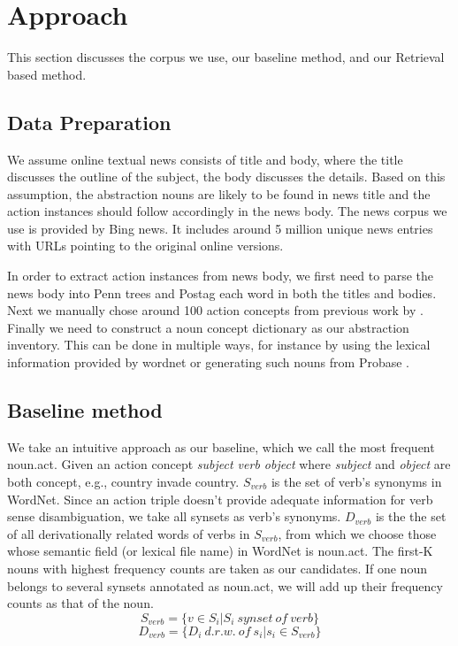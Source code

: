\section{Approach}
This section discusses the corpus we use, our baseline method, 
and our Retrieval based method.

\subsection{Data Preparation}

We assume online textual news consists of title and body, where
the title discusses the outline of the subject, the body discusses
the details. Based on this assumption, the abstraction nouns are
likely to be found in news title and the action instances should 
follow accordingly in the news body. 
The news corpus we use is provided by Bing news. It includes around
5 million unique news entries with URLs pointing to the original 
online versions. 

In order to extract action instances from news body, we first need to 
parse the news body into Penn trees and Postag each word in both
the titles and bodies. Next we manually chose around 100 action concepts
from previous work by \cite{gong2015representing}. Finally we need to construct a noun
concept dictionary as our abstraction inventory. This can be done in 
multiple ways, for instance by using the lexical information provided by
wordnet or generating such nouns from Probase \cite{wu2012probase}. 

\subsection{Baseline method}
We take an intuitive approach as our baseline, which we call the most frequent noun.act. Given an action concept \emph{subject verb object} where \emph{subject} and \emph{object} are both concept, e.g., country invade country. $S_{verb}$ is the set of verb's synonyms in WordNet. Since an action triple doesn't provide adequate information for verb sense disambiguation, we take all synsets as verb's synonyms. $D_{verb}$ is the the set of all derivationally related words of verbs in $S_{verb}$, from which we choose those whose semantic field (or lexical file name) in WordNet is noun.act. The first-K nouns with highest frequency counts are taken as our candidates. If one noun belongs to several synsets annotated as noun.act, we will add up their frequency counts as that of the noun.
\begin{equation*}
    S_{verb} = \{{ v \in S_i | S_i \ synset \ of \ verb}\}
\end{equation*}
\begin{equation*}
    D_{verb} = \{{ D_i \ d.r.w.  \ of \ s_i | s_i \in S_{verb}}\}
\end{equation*}

